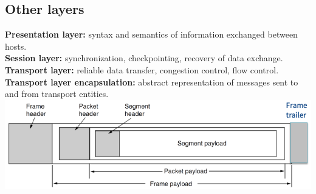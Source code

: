 \subsection{Other layers}
\textbf{Presentation layer:} syntax and semantics of information exchanged between hosts.\\
\textbf{Session layer:} synchronization, checkpointing, recovery of data exchange.\\
\textbf{Transport layer:} reliable data transfer, congestion control, flow control.\\
\textbf{Transport layer encapsulation:} abstract representation of messages sent to and from transport entities.\\
\includegraphics[width=\linewidth]{figs/encapsulation-of-segments.png}\\



